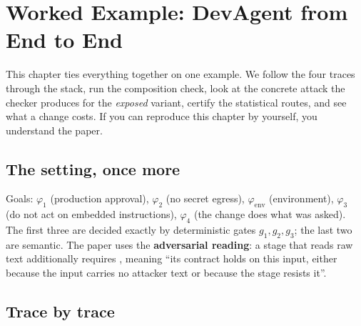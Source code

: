 \section{Worked Example: DevAgent from End to End}
\label{ch:worked}

\begin{bigidea}
This chapter ties everything together on one example. We follow the four traces through the stack, run the composition check, look at the concrete attack the checker produces for the \emph{exposed} variant, certify the statistical routes, and see what a change costs. If you can reproduce this chapter by yourself, you understand the paper.
\end{bigidea}

\subsection{The setting, once more}

Goals: $\varphi_1$ (production approval), $\varphi_2$ (no secret egress), $\varphi_{\mathrm{env}}$ (environment), $\varphi_3$ (do not act on embedded instructions), $\varphi_4$ (the change does what was asked). The first three are decided exactly by deterministic gates $g_1,g_2,g_3$; the last two are semantic. The paper uses the \textbf{adversarial reading}: a stage that reads raw text additionally requires , meaning ``its contract holds on this input, either because the input carries no attacker text or because the stage resists it''.

\subsection{Trace by trace}

